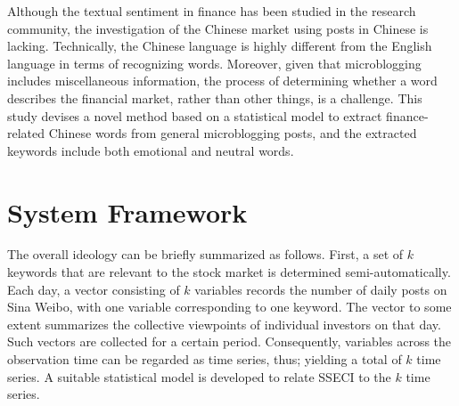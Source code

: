\documentclass[review,3p,times,12pt,number]{elsarticle}
\begin{document}

\indent
Although the textual sentiment in finance has been studied in the research community, the investigation of the Chinese market using posts in Chinese is lacking. Technically, the Chinese language is highly different from the English language in terms of recognizing words. Moreover, given that microblogging includes miscellaneous information, the process of determining whether a word describes the financial market, rather than other things, is a challenge. This study devises a novel method based on a statistical model to extract finance-related Chinese words from general microblogging posts, and the extracted keywords include both emotional and neutral words.


\section{System Framework}
\label{sec:weibo:sf}
The overall ideology can be briefly summarized as follows. First, a set of $k$ keywords that are relevant to the stock market is determined semi-automatically. Each day, a vector consisting of $k$ variables records the number of daily posts on Sina Weibo, with one variable corresponding to one keyword. The vector to some extent summarizes the collective viewpoints of individual investors on that day. Such vectors are collected for a certain period. Consequently, variables across the observation time can be regarded as time series, thus; yielding a total of $k$ time series. A suitable statistical model is developed to relate SSECI to the $k$ time series. %
\end{document}
